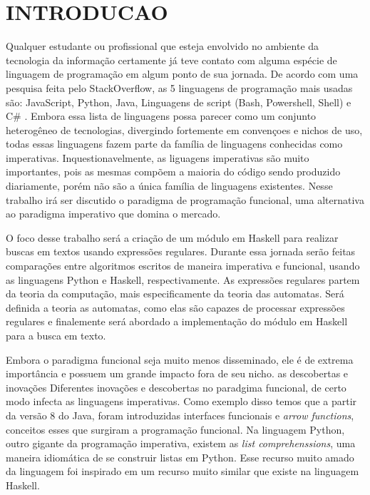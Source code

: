 \section{INTRODUCAO}

Qualquer estudante ou profissional que esteja envolvido no ambiente da tecnologia da informação certamente já teve contato com alguma espécie de linguagem de programação em algum ponto de sua jornada.
De acordo com uma pesquisa feita pelo StackOverflow, as 5 linguagens de programação mais usadas são: JavaScript, Python, Java, Linguagens de script (Bash, Powershell, Shell) e C\# \cite{stack-overflow}.
Embora essa lista de linguagens possa parecer como um conjunto heterogêneo de tecnologias, divergindo fortemente em convençoes e nichos de uso, todas essas linguagens fazem parte da família de linguagens conhecidas como imperativas.
Inquestionavelmente, as liguagens imperativas são muito importantes, pois as mesmas compõem a maioria do código sendo produzido diariamente, porém não são a única família de linguagens existentes.
Nesse trabalho irá ser discutido o paradigma de programação funcional, uma alternativa ao paradigma imperativo que domina o mercado.

O foco desse trabalho será a criação de um módulo em Haskell para realizar buscas em textos usando expressões regulares.
Durante essa jornada serão feitas comparações entre algoritmos escritos de maneira imperativa e funcional, usando as linguagens Python e Haskell, respectivamente.
As expressões regulares partem da teoria da computação, mais especificamente da teoria das automatas.
Será definida a teoria as automatas, como elas são capazes de processar expressões regulares e finalemente será abordado a implementação do módulo em Haskell para a busca em texto.

Embora o paradigma funcional seja muito menos disseminado, ele é de extrema importância e possuem um grande impacto fora de seu nicho. as descobertas e inovações 
Diferentes inovações e descobertas no paradgima funcional, de certo modo infecta as linguagens imperativas.
Como exemplo disso temos que a partir da versão 8 do Java, foram introduzidas interfaces funcionais e \emph{arrow functions}, conceitos esses que surgiram a programação funcional.
Na linguagem Python, outro gigante da programação imperativa, existem as \emph{list comprehenssions}, uma maneira idiomática de se construir listas em Python.
Esse recurso muito amado da linguagem foi inspirado em um recurso muito similar que existe na linguagem Haskell.

